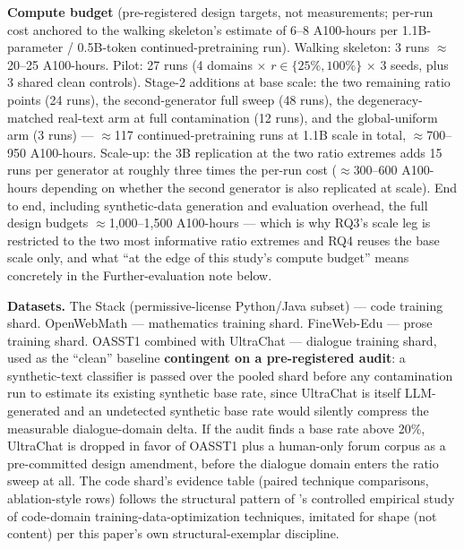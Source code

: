 \documentclass[11pt]{article}
\begin{document}
\textbf{Compute budget} (pre-registered design targets, not measurements; per-run cost anchored to the walking skeleton's estimate of 6--8 A100-hours per 1.1B-parameter / 0.5B-token continued-pretraining run). Walking skeleton: 3 runs $\approx$ 20--25 A100-hours. Pilot: 27 runs (4 domains $\times$ $r \in \{25\%, 100\%\}$ $\times$ 3 seeds, plus 3 shared clean controls). Stage-2 additions at base scale: the two remaining ratio points (24 runs), the second-generator full sweep (48 runs), the degeneracy-matched real-text arm at full contamination (12 runs), and the global-uniform arm (3 runs) --- $\approx$117 continued-pretraining runs at 1.1B scale in total, $\approx$700--950 A100-hours. Scale-up: the 3B replication at the two ratio extremes adds 15 runs per generator at roughly three times the per-run cost ($\approx$300--600 A100-hours depending on whether the second generator is also replicated at scale). End to end, including synthetic-data generation and evaluation overhead, the full design budgets $\approx$1,000--1,500 A100-hours --- which is why RQ3's scale leg is restricted to the two most informative ratio extremes and RQ4 reuses the base scale only, and what ``at the edge of this study's compute budget'' means concretely in the Further-evaluation note below.

\textbf{Datasets.} The Stack (permissive-license Python/Java subset) --- code training shard. OpenWebMath --- mathematics training shard. FineWeb-Edu --- prose training shard. OASST1 combined with UltraChat --- dialogue training shard, used as the ``clean'' baseline \textbf{contingent on a pre-registered audit}: a synthetic-text classifier is passed over the pooled shard before any contamination run to estimate its existing synthetic base rate, since UltraChat is itself LLM-generated and an undetected synthetic base rate would silently compress the measurable dialogue-domain delta. If the audit finds a base rate above 20\%, UltraChat is dropped in favor of OASST1 plus a human-only forum corpus as a pre-committed design amendment, before the dialogue domain enters the ratio sweep at all. The code shard's evidence table (paired technique comparisons, ablation-style rows) follows the structural pattern of \citet{EffectivenessTrainingDat}'s controlled empirical study of code-domain training-data-optimization techniques, imitated for shape (not content) per this paper's own structural-exemplar discipline.
\end{document}
